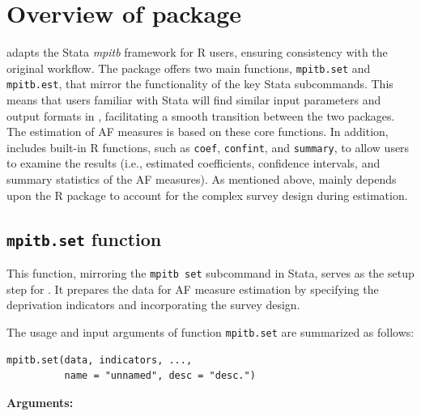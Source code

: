 \section{\texorpdfstring{Overview of  package}{Overview of  package}}\label{overview-of-package}

 adapts the Stata \emph{mpitb} framework for R users, ensuring consistency with the original workflow. The package offers two main functions, \texttt{mpitb.set} and \texttt{mpitb.est}, that mirror the functionality of the key Stata subcommands. This means that users familiar with Stata will find similar input parameters and output formats in , facilitating a smooth transition between the two packages. The estimation of AF measures is based on these core functions. In addition,  includes built-in R functions, such as \texttt{coef}, \texttt{confint}, and \texttt{summary}, to allow users to examine the results (i.e., estimated coefficients, confidence intervals, and summary statistics of the AF measures). As mentioned above,  mainly depends upon the R package  to account for the complex survey design during estimation.

\subsection{\texorpdfstring{\texttt{mpitb.set} function}{mpitb.set function}}\label{mpitb.set-function}

This function, mirroring the \texttt{mpitb\ set} subcommand in Stata, serves as the setup step for . It prepares the data for AF measure estimation by specifying the deprivation indicators and incorporating the survey design.

The usage and input arguments of function \texttt{mpitb.set} are summarized as follows:

\begin{verbatim}
mpitb.set(data, indicators, ..., 
          name = "unnamed", desc = "desc.")
\end{verbatim}

\textbf{Arguments:}

